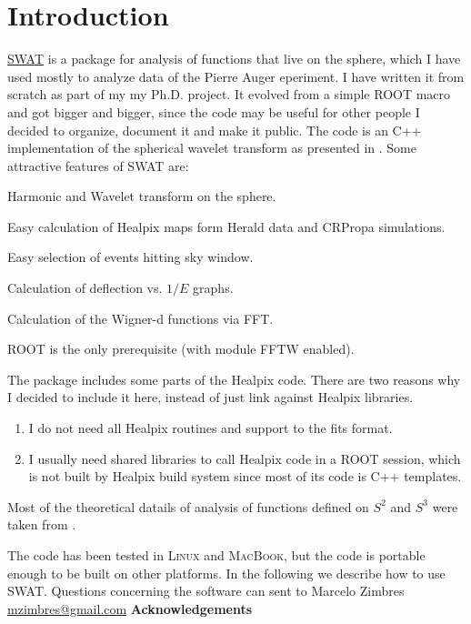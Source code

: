 \documentclass[12pt]{article}
\begin{document}
\section{Introduction} \label{ch::Introduction}

\href{http://www.ifi.unicamp.br/~mzimbres}{SWAT} is a package for analysis of
functions that live on the sphere, which I have used mostly to analyze data of the 
Pierre Auger eperiment. I have written it from scratch as part of my
my Ph.D. project. It evolved from a simple ROOT macro and got bigger and
bigger, since the code may be useful for other people I decided to organize, 
document it and make it public. The code is an C++ implementation of the
spherical wavelet transform as presented in \cite{wiaux}. Some attractive
features of SWAT are:

\begin{list}{}{}
\item Harmonic and Wavelet transform on the sphere.
\item Easy calculation of Healpix maps form Herald data and CRPropa simulations.
\item Easy selection of events hitting sky window.
\item Calculation of deflection vs. $1/E$ graphs.
\item Calculation of the Wigner-d functions via FFT.
\item ROOT is the only prerequisite (with module FFTW enabled).
\end{list}

The package includes some parts of the Healpix code. There are two reasons
why I decided to include it here, instead of just link against Healpix
libraries.
\begin{enumerate}
\item I do not need all Healpix routines and support to the fits format. 
\item I usually need shared libraries to call Healpix code in a ROOT session, which is not built by
Healpix build system since most of its code is C++ templates.
\end{enumerate}

Most of the theoretical datails of analysis of functions defined on $S^2$ and $S^3$ 
were taken from \cite{wiaux,rockmore,navaza}. 

The code has been tested in \textsc{Linux} and \textsc{MacBook}, but the code
is portable enough to be built on other platforms.  In the following we
describe how to use SWAT. Questions concerning the software can sent to Marcelo
Zimbres \href{mailto:mzimbres@gmail.com}{mzimbres@gmail.com}
\vspace{1cm}
\newline
{\bf \large Acknowledgements}
\vspace{1cm}
\end{document}

